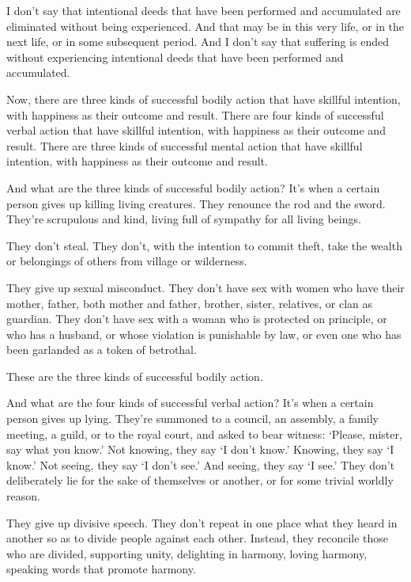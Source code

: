 \documentclass[12pt,openany]{book}%
\begin{document}
I don’t say that intentional deeds that have been performed and accumulated are eliminated without being experienced. And that may be in this very life, or in the next life, or in some subsequent period. And I don’t say that suffering is ended without experiencing intentional deeds that have been performed and accumulated. 

Now, there are three kinds of successful bodily action that have skillful intention, with happiness as their outcome and result. There are four kinds of successful verbal action that have skillful intention, with happiness as their outcome and result. There are three kinds of successful mental action that have skillful intention, with happiness as their outcome and result. 

And what are the three kinds of successful bodily action? It’s when a certain person gives up killing living creatures. They renounce the rod and the sword. They’re scrupulous and kind, living full of sympathy for all living beings. 

They don’t steal. They don’t, with the intention to commit theft, take the wealth or belongings of others from village or wilderness. 

They give up sexual misconduct. They don’t have sex with women who have their mother, father, both mother and father, brother, sister, relatives, or clan as guardian. They don’t have sex with a woman who is protected on principle, or who has a husband, or whose violation is punishable by law, or even one who has been garlanded as a token of betrothal. 

These are the three kinds of successful bodily action. 

And what are the four kinds of successful verbal action? It’s when a certain person gives up lying. They’re summoned to a council, an assembly, a family meeting, a guild, or to the royal court, and asked to bear witness: ‘Please, mister, say what you know.’ Not knowing, they say ‘I don’t know.’ Knowing, they say ‘I know.’ Not seeing, they say ‘I don’t see.’ And seeing, they say ‘I see.’ They don’t deliberately lie for the sake of themselves or another, or for some trivial worldly reason. 

They give up divisive speech. They don’t repeat in one place what they heard in another so as to divide people against each other. Instead, they reconcile those who are divided, supporting unity, delighting in harmony, loving harmony, speaking words that promote harmony. 
\end{document}
